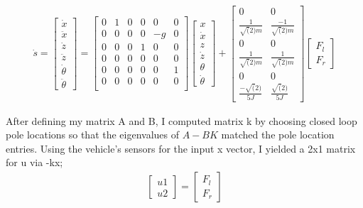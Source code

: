 \documentclass[a4paper,12pt]{article}
\begin{document}
\begin{align}
    \dot{s} = \begin{bmatrix}
    \dot{x}\\ \ddot{x}\\ \dot{z}\\ \ddot{z}\\ \dot{\theta}\\ \ddot{\theta}
    \end{bmatrix} = \begin{bmatrix}
    0 & 1 & 0 & 0 & 0 & 0 \\
    0 & 0 & 0 & 0 & -g & 0 \\
    0 & 0 & 0 & 1 & 0 & 0 \\
    0 & 0 & 0 & 0 & 0 & 0 \\
    0 & 0 & 0 & 0 & 0 & 1 \\
    0 & 0 & 0 & 0 & 0 & 0 \\
    \end{bmatrix}
    \begin{bmatrix}
    x \\ \dot{x} \\ z \\ \dot{z} \\ \theta \\ \dot{\theta}
    \end{bmatrix} + \begin{bmatrix}
    0 & 0 \\ \frac{1}{\sqrt(2)m} & \frac{-1}{\sqrt(2)m} \\ 0 & 0 \\ \frac{1}{\sqrt(2)m} & \frac{1}{\sqrt(2)m}\\ 0 & 0 \\ \frac{-\sqrt(2)}{5J} & \frac{\sqrt(2)}{5J}
    \end{bmatrix}
    \begin{bmatrix}
    F_{l} \\ F_{r}
    \end{bmatrix}
\end{align}

After defining my matrix A and B, I computed matrix k by choosing closed loop pole locations so that the eigenvalues of $A-BK$ matched the pole location entries. Using the vehicle's sensors for the input x vector, I yielded a 2x1 matrix for u via -kx;
\begin{align}
    \begin{bmatrix}
    u1 \\ u2
    \end{bmatrix} = \begin{bmatrix}
    F_{l}\\F_{r}
    \end{bmatrix}
\end{align}
\end{document}
